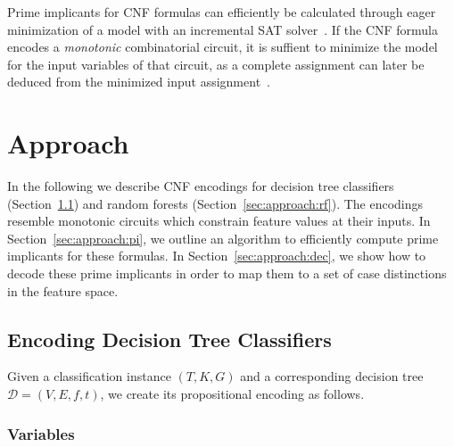 \documentclass[a4paper, USenglish, cleveref, autoref, thm-restate]{lipics-v2021}
\theoremstyle{definition}
\begin{document}
Prime implicants for CNF formulas can efficiently be calculated through eager minimization of a model with an incremental SAT solver~\cite{Iser:2013:Minimizing,Iser:2020:Disse}. 
If the CNF formula encodes a \emph{monotonic} combinatorial circuit, it is suffient to minimize the model for the input variables of that circuit, as a complete assignment can later be deduced from the minimized input assignment~\cite{Iser:2020:Disse}. 


\section{Approach}
\label{sec:approach}

In the following we describe CNF encodings for decision tree classifiers (Section~\ref{sec:approach:dt}) and random forests (Section~\ref{sec:approach:rf}). 
The encodings resemble monotonic circuits which constrain feature values at their inputs. 
In Section~\ref{sec:approach:pi}, we outline an algorithm to efficiently compute prime implicants for these formulas. 
In Section~\ref{sec:approach:dec}, we show how to decode these prime implicants in order to map them to a set of case distinctions in the feature space. 

\subsection{Encoding Decision Tree Classifiers}
\label{sec:approach:dt}

Given a classification instance $(T, K, G)$ and a corresponding decision tree $\mathcal{D}=(V, E, f, t)$, we create its propositional encoding as follows. 

\subsubsection{Variables} 

\newcommand{\classv}[1]{\alpha(#1)}
\newcommand{\nodehv}[1]{\beta^+(#1)}
\newcommand{\nodelv}[1]{\beta^-(#1)}
\newcommand{\interv}[2]{\gamma(#1,#2)}
\end{document}
